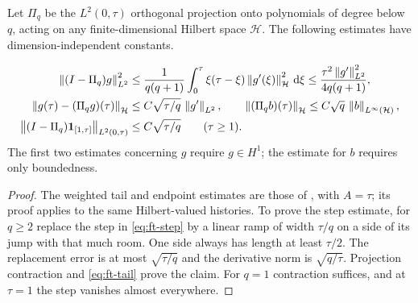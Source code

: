 Let $\Pi_q$ be the $L^2(0,\tau)$ orthogonal projection onto polynomials
of degree below $q$, acting on any finite-dimensional Hilbert space
$\mathcal H$.  The following estimates have dimension-independent
constants.
\begin{lemma}
\label{lem:ft-polynomial}
\begin{align}
 \left\lVert (I-\Pi_q)g\right\rVert_{L^2}^2
 &\le\frac{1}{q(q+1)}\int_0^\tau
       \xi(\tau-\xi)\left\lVert g'(\xi)\right\rVert_{\mathcal H}^2\,\mathrm{d}\xi
 \le\frac{\tau^2\left\lVert g'\right\rVert_{L^2}^2}{4q(q+1)},
 \label{eq:ft-tail}\\
 \left\lVert g(\tau)-(\Pi_qg)(\tau)\right\rVert_{\mathcal H}
 &\le C\sqrt{\tau/q}\,\left\lVert g'\right\rVert_{L^2},
 \qquad
 \left\lVert (\Pi_qb)(\tau)\right\rVert_{\mathcal H}
 \le C\sqrt q\,\left\lVert b\right\rVert_{L^\infty(\mathcal H)},
 \label{eq:ft-endpoints}\\
 \left\lVert (I-\Pi_q)\mathbf1_{[1,\tau]}\right\rVert_{L^2(0,\tau)}
 &\le C\sqrt{\tau/q}\qquad(\tau\ge1).
 \label{eq:ft-step}
\end{align}
The first two estimates concerning $g$ require $g\in H^1$; the estimate
for $b$ requires only boundedness.
\end{lemma}

\begin{proof}
The weighted tail and endpoint estimates are those of
, with $A=\tau$; its proof applies to the
same Hilbert-valued histories.  To prove the step estimate,
for $q\ge2$ replace the step in \eqref{eq:ft-step} by a linear
ramp of width $\tau/q$ on a side of its jump with that much room.
One side always has length at least $\tau/2$.  The replacement error is
at most $\sqrt{\tau/q}$ and the derivative norm is $\sqrt{q/\tau}$.
Projection contraction and \eqref{eq:ft-tail} prove the claim.
For $q=1$ contraction suffices, and at $\tau=1$ the step vanishes almost
everywhere.
\end{proof}

